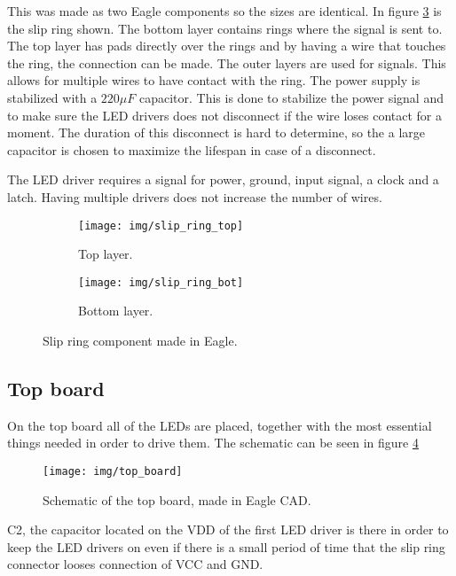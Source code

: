 This was made as two Eagle components so the sizes are identical.
In figure \ref{fig:slip_ring_eagle} is the slip ring shown.
The bottom layer contains rings where the signal is sent to.
The top layer has pads directly over the rings and by having a wire that touches the ring, the connection can be made.
The outer layers are used for signals.
This allows for multiple wires to have contact with the ring.
The power supply is stabilized with a $220 \mu F$ capacitor.
This is done to stabilize the power signal and to make sure the LED drivers does not disconnect if the wire loses contact for a moment.
The duration of this disconnect is hard to determine, so the a large capacitor is chosen to maximize the lifespan in case of a disconnect.

The LED driver requires a signal for power, ground, input signal, a clock and a latch.
Having multiple drivers does not increase the number of wires.

\begin{figure}[h]
 \centering
 \begin{subfigure}{0.4\linewidth}
 \centering
  \texttt{[image: img/slip\_ring\_top]}
 \caption{Top layer.}
 \label{fig:slip_ring_top}
 \end{subfigure}
 \begin{subfigure}{0.4\linewidth}
 \centering
  \texttt{[image: img/slip\_ring\_bot]}
 \caption{Bottom layer.}
 \label{fig:slip_ring_bot}
 \end{subfigure}
 \caption{Slip ring component made in Eagle.}
 \label{fig:slip_ring_eagle}
\end{figure}

\subsection{Top board}
On the top board all of the LEDs are placed, together with the most essential things needed in order to drive them.
The schematic can be seen in figure \ref{fig:top_board}
\begin{figure}
 \centering
 \texttt{[image: img/top\_board]}
 \caption{Schematic of the top board, made in Eagle CAD.}
 \label{fig:top_board}
\end{figure}

C2, the capacitor located on the VDD of the first LED driver is there in order to keep the LED drivers on even if there is a small period of time that the slip ring connector looses connection of VCC and GND.